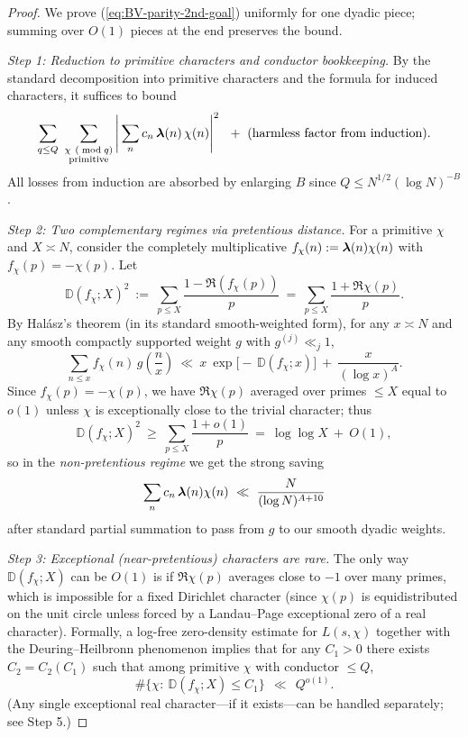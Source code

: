 \documentclass[11pt]{article}
\def\eqref#1{(\ref{#1})}%
\theoremstyle{definition}
\theoremstyle{remark}
\numberwithin{equation}{part}
\begin{document}
\begin{proof}
	We prove \eqref{eq:BV-parity-2nd-goal} uniformly for one dyadic piece; summing over $O(1)$ pieces at the end preserves the bound.

	\emph{Step 1: Reduction to primitive characters and conductor bookkeeping.}
	By the standard decomposition into primitive characters and the formula for induced characters, it suffices to bound
	\[
		\sum_{q\le Q}\ \sum_{\substack{\chi\ (\bmod q)\\ \text{primitive}}}
		\Bigg|\sum_{n} c_n\,\boldsymbol{\lambda}(n)\,\chi(n)\Bigg|^2
		\ \ +\ \text{(harmless factor from induction)}.
	\]
	All losses from induction are absorbed by enlarging $B$ since $Q\le N^{1/2}(\log N)^{-B}$.

	\emph{Step 2: Two complementary regimes via pretentious distance.}
	For a primitive $\chi$ and $X\asymp N$, consider the completely multiplicative $f_\chi(n):=\boldsymbol{\lambda}(n)\chi(n)$ with $f_\chi(p)=-\chi(p)$. Let
	\[
		\mathbb{D}(f_\chi;X)^2\ :=\ \sum_{p\le X}\frac{1-\Re(f_\chi(p))}{p}
		\ =\ \sum_{p\le X}\frac{1+\Re\chi(p)}{p}.
	\]
	By Halász's theorem (in its standard smooth-weighted form), for any $x\asymp N$ and any smooth compactly supported weight $g$ with $g^{(j)}\ll_j 1$,
	\begin{equation}\label{eq:halasz}
		\sum_{n\le x} f_\chi(n)\,g\!\left(\frac{n}{x}\right)
		\ \ll\ x\ \exp\!\big[-\,\mathbb{D}(f_\chi;x)\big]\ +\ \frac{x}{(\log x)^A}.
	\end{equation}
	Since $f_\chi(p)=-\chi(p)$, we have $\Re\chi(p)$ averaged over primes $\le X$ equal to $o(1)$ unless $\chi$ is exceptionally close to the trivial character; thus
	\[
		\mathbb{D}(f_\chi;X)^2
		\ \ge\ \sum_{p\le X}\frac{1+o(1)}{p}
		\ =\ \log\log X\ +\ O(1),
	\]
	so in the \emph{non-pretentious regime} we get the strong saving
	\begin{equation}\label{eq:nonpret-bound}
		\sum_{n} c_n\,\boldsymbol{\lambda}(n)\chi(n)
		\ \ll\ \frac{N}{(\log N)^{A+10}}
	\end{equation}
	after standard partial summation to pass from $g$ to our smooth dyadic weights.

	\emph{Step 3: Exceptional (near-pretentious) characters are rare.}
	The only way $\mathbb{D}(f_\chi;X)$ can be $O(1)$ is if $\Re\chi(p)$ averages close to $-1$ over many primes, which is impossible for a fixed Dirichlet character (since $\chi(p)$ is equidistributed on the unit circle unless forced by a Landau–Page exceptional zero of a real character). Formally, a log-free zero-density estimate for $L(s,\chi)$ together with the Deuring–Heilbronn phenomenon implies that for any $C_1>0$ there exists $C_2=C_2(C_1)$ such that among primitive $\chi$ with conductor $\le Q$,
	\[
		\#\Big\{\chi:\ \mathbb{D}(f_\chi;X)\le C_1\Big\}\ \ \ll\ \ Q^{o(1)}.
	\]
	(Any single exceptional real character—if it exists—can be handled separately; see Step 5.)


\end{proof}
\end{document}
